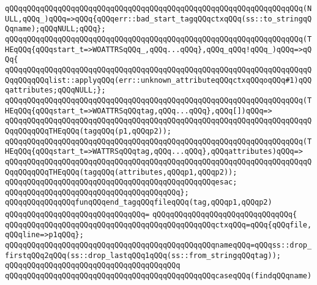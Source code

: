 \verb|qQQqqQQqqQQqqQQqqQQqqQQqqQQqqQQqqQQqqQQqqQQqqQQqqQQqqQQqqQQqqQQqqQQq(NULL,qQQq_)qQQq=>qQQq{qQQqerr::bad_start_tagqQQqctxqQQq(ss::to_stringqQQqname);qQQqNULL;qQQq};|\newline
\newline
\verb|qQQqqQQqqQQqqQQqqQQqqQQqqQQqqQQqqQQqqQQqqQQqqQQqqQQqqQQqqQQqqQQqqQQq(THEqQQq{qQQqstart_t=>WOATTRSqQQq_,qQQq...qQQq},qQQq_qQQq!qQQq_)qQQq=>qQQq{|\newline
\verb|qQQqqQQqqQQqqQQqqQQqqQQqqQQqqQQqqQQqqQQqqQQqqQQqqQQqqQQqqQQqqQQqqQQqqQQqqQQqqQQqlist::applyqQQq(err::unknown_attributeqQQqctxqQQqoqQQq#1)qQQqattributes;qQQqNULL;};|\newline
\newline
\verb|qQQqqQQqqQQqqQQqqQQqqQQqqQQqqQQqqQQqqQQqqQQqqQQqqQQqqQQqqQQqqQQqqQQq(THEqQQq{qQQqstart_t=>WOATTRSqQQqtag,qQQq...qQQq},qQQq[])qQQq=>|\newline
\verb|qQQqqQQqqQQqqQQqqQQqqQQqqQQqqQQqqQQqqQQqqQQqqQQqqQQqqQQqqQQqqQQqqQQqqQQqqQQqqQQqTHEqQQq(tagqQQq(p1,qQQqp2));|\newline
\newline
\verb|qQQqqQQqqQQqqQQqqQQqqQQqqQQqqQQqqQQqqQQqqQQqqQQqqQQqqQQqqQQqqQQqqQQq(THEqQQq{qQQqstart_t=>WATTRSqQQqtag,qQQq...qQQq},qQQqattributes)qQQq=>|\newline
\verb|qQQqqQQqqQQqqQQqqQQqqQQqqQQqqQQqqQQqqQQqqQQqqQQqqQQqqQQqqQQqqQQqqQQqqQQqqQQqqQQqTHEqQQq(tagqQQq(attributes,qQQqp1,qQQqp2));|\newline
\verb|qQQqqQQqqQQqqQQqqQQqqQQqqQQqqQQqqQQqqQQqqQQqqQQqesac;|\newline
\verb|qQQqqQQqqQQqqQQqqQQqqQQqqQQqqQQqqQQqqQQq};|\newline
\newline
\verb|qQQqqQQqqQQqqQQqfunqQQqend_tagqQQqfileqQQq(tag,qQQqp1,qQQqp2)|\newline
\verb|qQQqqQQqqQQqqQQqqQQqqQQqqQQqqQQq=|\newline
\verb|qQQqqQQqqQQqqQQqqQQqqQQqqQQqqQQq{|\newline
\verb|qQQqqQQqqQQqqQQqqQQqqQQqqQQqqQQqqQQqqQQqqQQqqQQqctxqQQq=qQQq{qQQqfile,qQQqline=>p1qQQq};|\newline
\verb|qQQqqQQqqQQqqQQqqQQqqQQqqQQqqQQqqQQqqQQqqQQqqQQqnameqQQq=qQQqss::drop_firstqQQq2qQQq(ss::drop_lastqQQq1qQQq(ss::from_stringqQQqtag));|\newline
\verb|qQQqqQQqqQQqqQQqqQQqqQQqqQQqqQQqqQQqqQQq|\newline
\verb|qQQqqQQqqQQqqQQqqQQqqQQqqQQqqQQqqQQqqQQqqQQqqQQqcaseqQQq(findqQQqname)|\newline
